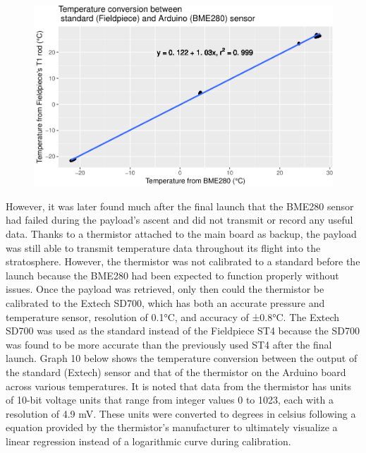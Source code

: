 \documentclass[12pt,]{article}
\begin{document}
\begin{figure}[h]

{\centering \includegraphics{paper_files/figure-latex/bme_temp-1} 

}

\caption{\label{fig:figs}}\label{fig:bme_temp}
\end{figure}

However, it was later found much after the final launch that the BME280
sensor had failed during the payload's ascent and did not transmit or
record any useful data. Thanks to a thermistor attached to the main
board as backup, the payload was still able to transmit temperature data
throughout its flight into the stratosphere. However, the thermistor was
not calibrated to a standard before the launch because the BME280 had
been expected to function properly without issues. Once the payload was
retrieved, only then could the thermistor be calibrated to the Extech
SD700, which has both an accurate pressure and temperature sensor,
resolution of 0.1°C, and accuracy of ±0.8°C. The Extech SD700 was used
as the standard instead of the Fieldpiece ST4 because the SD700 was
found to be more accurate than the previously used ST4 after the final
launch. Graph 10 below shows the temperature conversion between the
output of the standard (Extech) sensor and that of the thermistor on the
Arduino board across various temperatures. It is noted that data from
the thermistor has units of 10-bit voltage units that range from integer
values 0 to 1023, each with a resolution of 4.9 mV. These units were
converted to degrees in celsius following a equation provided by the
thermistor's manufacturer to ultimately visualize a linear regression
instead of a logarithmic curve during calibration.
\end{document}
